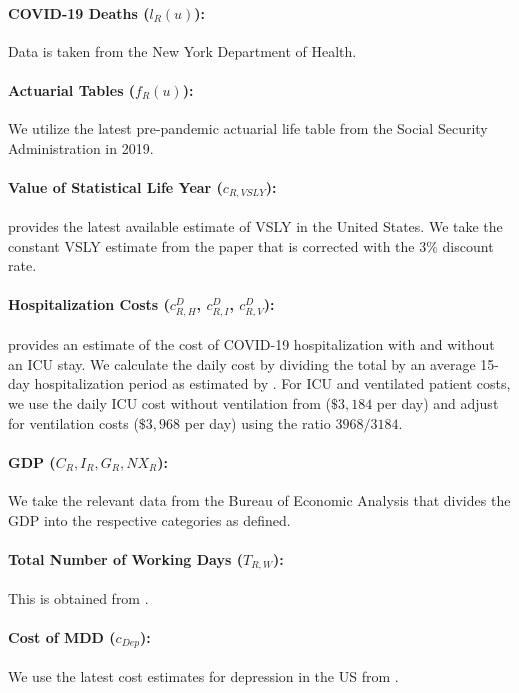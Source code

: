 \documentclass[msom,blindrev]{informs3} %
\begin{document}
\begin{APPENDICES}
\paragraph{COVID-19 Deaths ($l_R(u)$):} Data is taken from the New York Department of Health. 
\paragraph{Actuarial Tables ($f_R(u)$):} We utilize the latest pre-pandemic actuarial life table from the Social Security Administration in 2019. 
\paragraph{Value of Statistical Life Year ($c_{R,VSLY}$):}  provides the latest available estimate of VSLY in the United States. We take the constant VSLY estimate from the paper that is corrected with the $3\%$ discount rate.
\paragraph{Hospitalization Costs ($c^D_{R,H}$, $c^D_{R,I}$, $c^D_{R,V}$):}  provides an estimate of the cost of COVID-19 hospitalization with and without an ICU stay. We calculate the daily cost by dividing the total by an average 15-day hospitalization period as estimated by . For ICU and ventilated patient costs, we use the daily ICU cost without ventilation from  ($\$3,184$ per day) and adjust for ventilation costs ($\$3,968$ per day) using the ratio $3968/3184$.


\paragraph{GDP ($C_R, I_R, G_R, NX_R$):} We take the relevant data from the Bureau of Economic Analysis that divides the GDP into the respective categories as defined. 
\paragraph{Total Number of Working Days ($T_{R,W}$):} This is obtained from .

\paragraph{Cost of MDD ($c_{Dep}$):} We use the latest cost estimates for depression in the US from .



\end{APPENDICES}
\end{document}
